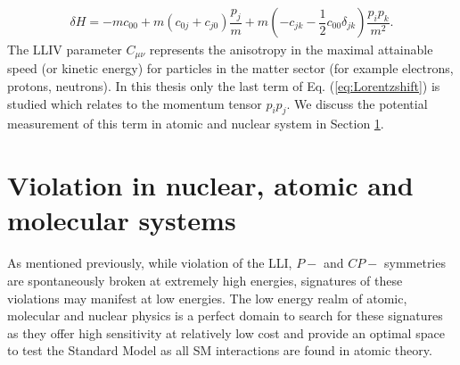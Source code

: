\documentclass[10pt,a4paper, twoside, openright]{report}
\begin{document}
\begin{align} \label{eq:Lorentzshift}
\delta H = -mc_{00} + m\left(c_{0j} + c_{j0}\right)\dfrac{p_j}{m} + m\left(-c_{jk} - \dfrac{1}{2}c_{00}\delta_{jk}\right)\dfrac{p_ip_k}{m^2}.
\end{align} 
The LLIV parameter $C_{\mu\nu}$ represents the anisotropy in the maximal attainable speed (or kinetic energy) for particles in the matter sector (for example electrons, protons, neutrons). In this thesis only the last term of  Eq. (\ref{eq:Lorentzshift}) is studied  which relates to the momentum tensor $p_ip_j$. We discuss the potential measurement of this term in atomic and nuclear system in Section \ref{sec:ViolationInAtoms}. 
\section{Violation in nuclear, atomic and molecular systems} \label{sec:ViolationInAtoms}
As mentioned previously, while violation of the LLI, $P-$ and $CP-$ symmetries are spontaneously broken at extremely high energies, signatures of these violations may manifest at low energies. The low energy realm of atomic, molecular and nuclear physics is a perfect domain to search for these signatures as they offer high sensitivity at relatively low cost and provide an optimal space to test the Standard Model as all SM interactions are found in atomic theory. 
\end{document}
